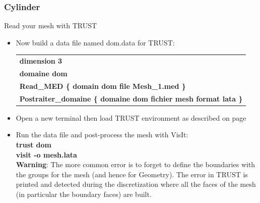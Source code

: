 \documentclass[10pt, hyperref={unicode=true,pdfusetitle, bookmarks=true,bookmarksnumbered=false,bookmarksopen=false, breaklinks=false,pdfborder={0 0l 1},backref=true,colorlinks=true,linkcolor=darkblue,pageanchor}]{beamer}
\begin{document}
\begin{frame}
\frametitle{Cylinder}
\begin{block}{Read your mesh with TRUST}

\begin{itemize}
\item \label{read_mesh} Now build a data file named dom.data for TRUST:\\
\vspace{0.2cm}
\begin{tabular}{|l|}
\hline 
\textbf{dimension 3 }\tabularnewline
\textbf{domaine dom }\tabularnewline
\textbf{Read\_MED \{ domain dom file Mesh\_1.med \} }\tabularnewline
\textbf{Postraiter\_domaine\index{Postraiter\_domaine} \{ domaine dom fichier mesh format lata\index{format lata}
\}}\tabularnewline
\hline 
\end{tabular}

\item Open a new terminal then load TRUST environment as described on page \pageref{init_trust}
\item Run the data file and post-process the mesh with VisIt:\\
\textbf{trust dom} \\
\textbf{visit -o mesh.lata} \\
\vspace{0.2cm}
\textbf{Warning}: The more common error is to forget to define the boundaries with the groups for the mesh (and hence for Geometry). The error in TRUST is printed and detected during the discretization where all the faces of the mesh (in particular the boundary faces) are built.

\end{itemize}

\end{block}
\end{frame}
\end{document}
